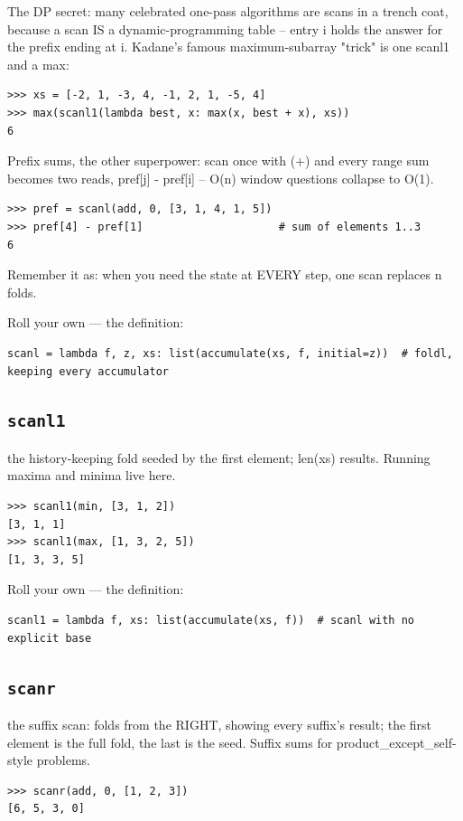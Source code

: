 \documentclass[10pt,letterpaper]{book}
\begin{document}
The DP secret: many celebrated one-pass algorithms are scans in a trench coat, because a scan IS a dynamic-programming table -- entry i holds the answer for the prefix ending at i. Kadane's famous maximum-subarray "trick" is one scanl1 and a max:

\begin{lstlisting}[style=ex]
>>> xs = [-2, 1, -3, 4, -1, 2, 1, -5, 4]
>>> max(scanl1(lambda best, x: max(x, best + x), xs))
6
\end{lstlisting}

Prefix sums, the other superpower: scan once with (+) and every range sum becomes two reads, pref[j] - pref[i] -- O(n) window questions collapse to O(1).

\begin{lstlisting}[style=ex]
>>> pref = scanl(add, 0, [3, 1, 4, 1, 5])
>>> pref[4] - pref[1]                     # sum of elements 1..3
6
\end{lstlisting}

Remember it as: when you need the state at EVERY step, one scan replaces n folds.


Roll your own --- the definition:

\begin{lstlisting}[style=ex]
scanl = lambda f, z, xs: list(accumulate(xs, f, initial=z))  # foldl, keeping every accumulator
\end{lstlisting}

\subsection{\texttt{scanl1}}\label{def:scanl1}
the history-keeping fold seeded by the first element; len(xs) results. Running maxima and minima live here.
\begin{lstlisting}[style=ex]
>>> scanl1(min, [3, 1, 2])
[3, 1, 1]
>>> scanl1(max, [1, 3, 2, 5])
[1, 3, 3, 5]
\end{lstlisting}

Roll your own --- the definition:

\begin{lstlisting}[style=ex]
scanl1 = lambda f, xs: list(accumulate(xs, f))  # scanl with no explicit base
\end{lstlisting}
\subsection{\texttt{scanr}}\label{def:scanr}
the suffix scan: folds from the RIGHT, showing every suffix's result; the first element is the full fold, the last is the seed. Suffix sums for product\_except\_self-style problems.
\begin{lstlisting}[style=ex]
>>> scanr(add, 0, [1, 2, 3])
[6, 5, 3, 0]
\end{lstlisting}
\end{document}
